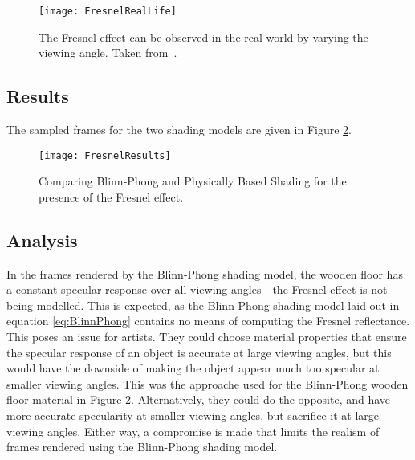 \begin{figure}[h]
	\centering
	\texttt{[image: FresnelRealLife]}
	\caption{The Fresnel effect can be observed in the real world by varying the viewing angle. Taken from~\cite{MarkusLecture}.}
	\label{fig:FresnelRealLife}
\end{figure}

\subsection{Results}

The sampled frames for the two shading models are given in Figure \ref{fig:FresnelResults}.

\begin{figure}[h]
	\centering
	\texttt{[image: FresnelResults]}
	\caption{Comparing Blinn-Phong and Physically Based Shading for the presence of the Fresnel effect.}
	\label{fig:FresnelResults}
\end{figure}

\subsection{Analysis}

In the frames rendered by the Blinn-Phong shading model, the wooden floor has a constant specular response over all viewing angles - the Fresnel effect is not being modelled. This is expected, as the Blinn-Phong shading model laid out in equation \ref{eq:BlinnPhong} contains no means of computing the Fresnel reflectance. This poses an issue for artists. They could choose material properties that ensure the specular response of an object is accurate at large viewing angles, but this would have the downside of making the object appear much too specular at smaller viewing angles. This was the approache used for the Blinn-Phong wooden floor material in Figure \ref{fig:FresnelResults}. Alternatively, they could do the opposite, and have more accurate specularity at smaller viewing angles, but sacrifice it at large viewing angles. Either way, a compromise is made that limits the realism of frames rendered using the Blinn-Phong shading model.

